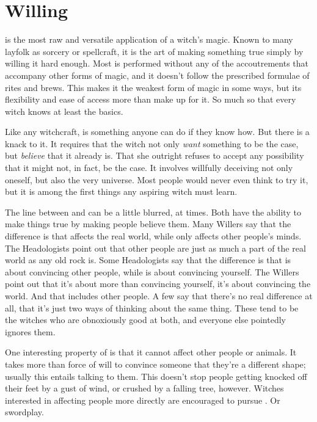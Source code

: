 \chapter{Willing}

 is the most raw and versatile application of a witch's magic.
Known to many layfolk as sorcery or spellcraft, it is the art of making something true simply by willing it hard enough.
Most  is performed without any of the accoutrements that accompany other forms of magic, and it doesn't follow the prescribed formulae of rites and brews.
This makes it the weakest form of magic in some ways, but its flexibility and ease of access more than make up for it.
So much so that every witch knows at least the basics.

Like any witchcraft,  is something anyone can do if they know how.
But there is a knack to it.
It requires that the witch not only \emph{want} something to be the case, but \emph{believe} that it already is.
That she outright refuses to accept any possibility that it might not, in fact, be the case.
It involves willfully deceiving not only oneself, but also the very universe.
Most people would never even think to try it, but it is among the first things any aspiring witch must learn.

The line between  and  can be a little blurred, at times.
Both have the ability to make things true by making people believe them.
Many Willers say that the difference is that  affects the real world, while  only affects other people's minds.
The Headologists point out that other people are just as much a part of the real world as any old rock is.
Some Headologists say that the difference is that  is about convincing other people, while  is about convincing yourself.
The Willers point out that it's about more than convincing yourself, it's about convincing the world.
And that includes other people.
A few say that there's no real difference at all, that it's just two ways of thinking about the same thing.
These tend to be the witches who are obnoxiously good at both, and everyone else pointedly ignores them.

One interesting property of  is that it cannot affect other people or animals.
It takes more than force of will to convince someone that they're a different shape; usually this entails talking to them.
This doesn't stop people getting knocked off their feet by a gust of wind, or crushed by a falling tree, however.
Witches interested in affecting people more directly are encouraged to pursue .
Or swordplay.


